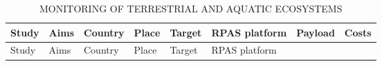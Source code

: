 \documentclass[]{interact}
\theoremstyle{plain}%
\theoremstyle{definition}
\theoremstyle{remark}
\begin{document}
\begin{longtable}[]{@{}llllllll@{}}
\caption{MONITORING OF TERRESTRIAL AND AQUATIC
ECOSYSTEMS}\tabularnewline
\toprule
\begin{minipage}[b]{0.11\columnwidth}\raggedright\strut
Study\strut
\end{minipage} & \begin{minipage}[b]{0.18\columnwidth}\raggedright\strut
Aims\strut
\end{minipage} & \begin{minipage}[b]{0.03\columnwidth}\raggedright\strut
Country\strut
\end{minipage} & \begin{minipage}[b]{0.14\columnwidth}\raggedright\strut
Place\strut
\end{minipage} & \begin{minipage}[b]{0.10\columnwidth}\raggedright\strut
Target\strut
\end{minipage} & \begin{minipage}[b]{0.09\columnwidth}\raggedright\strut
RPAS platform\strut
\end{minipage} & \begin{minipage}[b]{0.11\columnwidth}\raggedright\strut
Payload\strut
\end{minipage} & \begin{minipage}[b]{0.01\columnwidth}\raggedright\strut
Costs\strut
\end{minipage}\tabularnewline
\midrule
\endfirsthead
\toprule
\begin{minipage}[b]{0.11\columnwidth}\raggedright\strut
Study\strut
\end{minipage} & \begin{minipage}[b]{0.18\columnwidth}\raggedright\strut
Aims\strut
\end{minipage} & \begin{minipage}[b]{0.03\columnwidth}\raggedright\strut
Country\strut
\end{minipage} & \begin{minipage}[b]{0.14\columnwidth}\raggedright\strut
Place\strut
\end{minipage} & \begin{minipage}[b]{0.10\columnwidth}\raggedright\strut
Target\strut
\end{minipage} & \begin{minipage}[b]{0.09\columnwidth}\raggedright\strut
RPAS platform\strut
\end{minipage} & \begin{minipage}[b]{0.11\columnwidth}\raggedright\strut

\end{minipage}
\end{longtable}
\end{document}
